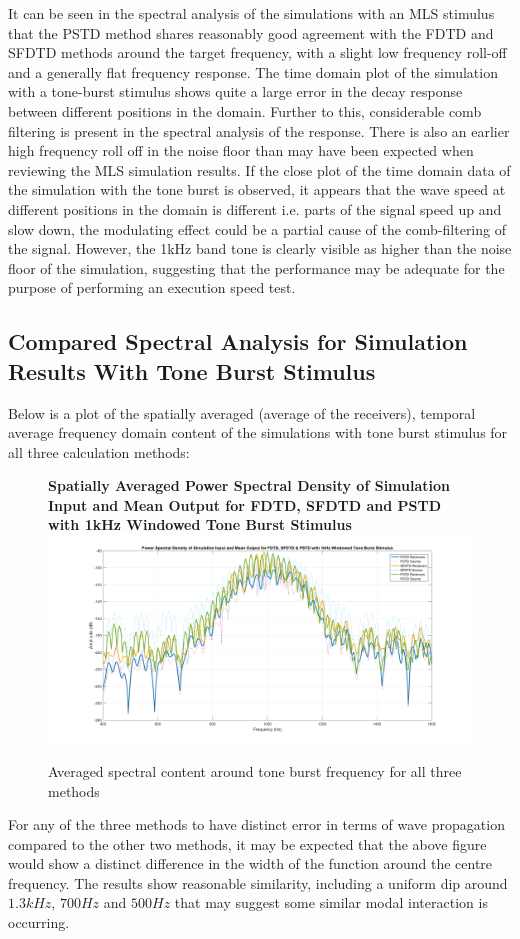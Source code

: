 It can be seen in the spectral analysis of the simulations with an MLS stimulus that the PSTD method shares reasonably good agreement with the FDTD and SFDTD methods around the target frequency, with a slight low frequency roll-off and a generally flat frequency response. The time domain plot of the simulation with a tone-burst stimulus shows quite a large error in the decay response between different positions in the domain. Further to this, considerable comb filtering is present in the spectral analysis of the response. There is also an earlier high frequency roll off in the noise floor than may have been expected when reviewing the MLS simulation results. If the close plot of the time domain data of the simulation with the tone burst is observed, it appears that the wave speed at different positions in the domain is different i.e. parts of the signal speed up and slow down, the modulating effect could be a partial cause of the comb-filtering of the signal. However, the 1kHz band tone is clearly visible as higher than the noise floor of the simulation, suggesting that the performance may be adequate for the purpose of performing an execution speed test.

\subsection{Compared Spectral Analysis for Simulation Results With Tone Burst Stimulus}
Below is a plot of the spatially averaged (average of the receivers), temporal average frequency domain content of the simulations with tone burst stimulus for all three calculation methods:\\

  \begin{figure}[H]
\centering
  \textbf{Spatially Averaged Power Spectral Density of Simulation Input and Mean Output for FDTD, SFDTD and PSTD with 1kHz Windowed Tone Burst Stimulus}
  \includegraphics[width=\textwidth]{./graphics/winTBval.png}
  \caption{Averaged spectral content around tone burst frequency for all three methods}
\end{figure}

For any of the three methods to have distinct error in terms of wave propagation compared to the other two methods, it may be expected that the above figure would show a distinct difference in the width of the function around the centre frequency. The results show reasonable similarity, including a uniform dip around $1.3kHz$, $700Hz$ and $500Hz$ that may suggest some similar modal interaction is occurring.

